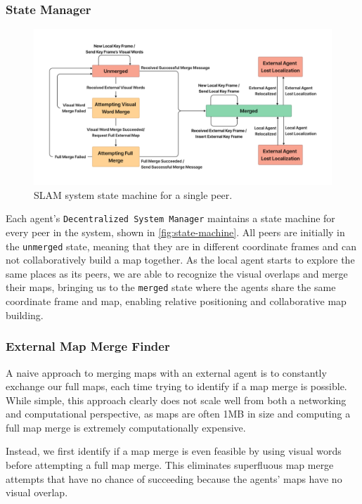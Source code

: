 \subsubsection{State Manager}
\label{sec:state-manager}

\begin{figure}[h]
    \centering
    \includegraphics[trim=5cm 5cm 5cm 5cm, scale=0.2]{figures/slam_system_state_machine.pdf}
    \caption{SLAM system state machine for a single peer.}
    \label{fig:state-machine}
\end{figure}

Each agent's \texttt{Decentralized System Manager} maintains a state machine for every peer in the system, shown in \autoref{fig:state-machine}. All peers are initially in the \texttt{unmerged} state, meaning that they are in different coordinate frames and can not collaboratively build a map together. As the local agent starts to explore the same places as its peers, we are able to recognize the visual overlaps and merge their maps, bringing us to the \texttt{merged} state where the agents share the same coordinate frame and map, enabling relative positioning and collaborative map building.

\subsubsection{External Map Merge Finder}
\label{sec:external-map-merge-finder}
A naive approach to merging maps with an external agent is to constantly exchange our full maps, each time trying to identify if a map merge is possible. While simple, this approach clearly does not scale well from both a networking and computational perspective, as maps are often \>1MB in size and computing a full map merge is extremely computationally expensive.

Instead, we first identify if a map merge is even feasible by using visual words before attempting a full map merge. This eliminates superfluous map merge attempts that have no chance of succeeding because the agents' maps have no visual overlap.

